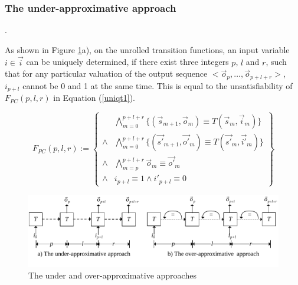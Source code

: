 \documentclass[runningheads,a4paper,orivec]{llncs}
\begin{document}
\subsubsection{The under-approximative approach}\label{subsub_sound}.

As shown in Figure \ref{fig_pc}a),
on the unrolled transition functions,
an input variable $i\in\vec{i}$ can be uniquely determined,
if there exist three integers $p$, $l$ and $r$,
such that for any particular valuation of the output sequence $<\vec{o}_p,\dots,\vec{o}_{p+l+r}>$,
$i_{p+l}$ cannot be 0 and 1 at the same time.
This is equal to the unsatisfiability of $F_{PC}(p,l,r)$ in Equation (\ref{uniqt1}).

\begin{equation}\label{uniqt1}
F_{PC}(p,l,r):=
\left\{
\begin{array}{cc}
&\bigwedge_{m=0}^{p+l+r}
\{
(\vec{s}_{m+1},\vec{o}_m)\equiv T(\vec{s}_m,\vec{i}_m)
\}
\\
\wedge&\bigwedge_{m=0}^{p+l+r}
\{
(\vec{s'}_{m+1},\vec{o'}_m)\equiv T(\vec{s'}_m,\vec{i'}_m)
\}
\\
\wedge&\bigwedge_{m=p}^{p+l+r}\vec{o}_m\equiv \vec{o'}_m \\
\wedge& i_{p+l}\equiv 1 \wedge  i'_{p+l}\equiv 0 
\end{array}
\right\}
\end{equation}

\begin{figure}[t]
\begin{center}
\includegraphics[width=\textwidth]{pc}
\end{center}
\caption{The under and over-approximative approaches}
  \label{fig_pc}
\end{figure}
\end{document}
